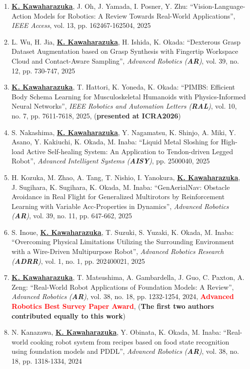 \documentclass[letterpaper,11pt]{article}
\begin{document}
\begin{enumerate}
\item \underline{\textbf{K. Kawaharazuka}}, J. Oh, J. Yamada, I. Posner, Y. Zhu: ``Vision-Language-Action Models for Robotics: A Review Towards Real-World Applications'', \textit{IEEE Access}, vol. 13, pp. 162467-162504, 2025
\item L. Wu, H. Jia, \underline{\textbf{K. Kawaharazuka}}, H. Ishida, K. Okada: ``Dexterous Grasp Dataset Augmentation based on Grasp Synthesis with Fingertip Workspace Cloud and Contact-Aware Sampling'', \textit{Advanced Robotics (\textit{\textbf{AR}})}, vol. 39, no. 12, pp. 730-747, 2025
\item \underline{\textbf{K. Kawaharazuka}}, T. Hattori, K. Yoneda, K. Okada: ``PIMBS: Efficient Body Schema Learning for Musculoskeletal Humanoids with Physics-Informed Neural Networks'', \textit{IEEE Robotics and Automation Letters (\textit{\textbf{RAL}})}, vol. 10, no. 7, pp. 7611-7618, 2025, (\textbf{presented at ICRA2026})
\item S. Nakashima, \underline{\textbf{K. Kawaharazuka}}, Y. Nagamatsu, K. Shinjo, A. Miki, Y. Asano, Y. Kakiuchi, K. Okada, M. Inaba: ``Liquid Metal Sloshing for High-load Active Self-healing System: An Application to Tendon-driven Legged Robot'', \textit{Advanced Intelligent Systems (\textit{\textbf{AISY}})}, pp. 2500040, 2025
\item H. Kozuka, M. Zhao, A. Tang, T. Nishio, I. Yanokura, \underline{\textbf{K. Kawaharazuka}}, J. Sugihara, K. Sugihara, K. Okada, M. Inaba: ``GenAerialNav: Obstacle Avoidance in Real Flight for Generalized Multirotors by Reinforcement Learning with Variable Acc-Properties in Dynamics'', \textit{Advanced Robotics (\textit{\textbf{AR}})}, vol. 39, no. 11, pp. 647-662, 2025
\item S. Inoue, \underline{\textbf{K. Kawaharazuka}}, T. Suzuki, S. Yuzaki, K. Okada, M. Inaba: ``Overcoming Physical Limitations Utilizing the Surrounding Environment with a Wire-Driven Multipurpose Robot'', \textit{Advanced Robotics Research (\textit{\textbf{ADRR}})}, vol. 1, no. 1, pp. 202400021, 2025
\item \underline{\textbf{K. Kawaharazuka}}, T. Matsushima, A. Gambardella, J. Guo, C. Paxton, A. Zeng: ``Real-World Robot Applications of Foundation Models: A Review'', \textit{Advanced Robotics (\textit{\textbf{AR}})}, vol. 38, no. 18, pp. 1232-1254, 2024, \textbf{\textcolor{red}{Advanced Robotics Best Survey Paper Award}}, (\textbf{The first two authors contributed equally to this work})
\item N. Kanazawa, \underline{\textbf{K. Kawaharazuka}}, Y. Obinata, K. Okada, M. Inaba: ``Real-world cooking robot system from recipes based on food state recognition using foundation models and PDDL'', \textit{Advanced Robotics (\textit{\textbf{AR}})}, vol. 38, no. 18, pp. 1318-1334, 2024

\end{enumerate}
\end{document}
